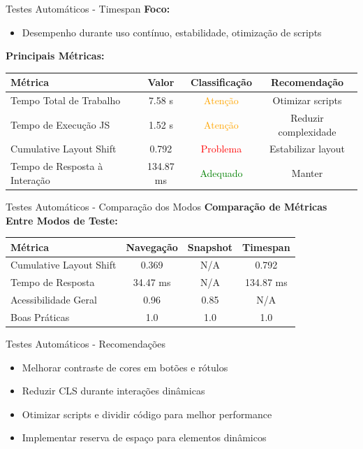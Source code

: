 \documentclass[landscape, 12pt]{beamer}
\begin{document}
\begin{frame}{Testes Automáticos - Timespan}
    \textbf{Foco:}
    \begin{itemize}
        \item Desempenho durante uso contínuo, estabilidade, otimização de scripts
    \end{itemize}
    \vspace{0.3cm}
    \textbf{Principais Métricas:}
    \begin{table}[h]
    \centering
    \tiny
    \begin{tabularx}{0.95\textwidth}{|X|c|c|c|}
    \hline
    \textbf{Métrica} & \textbf{Valor} & \textbf{Classificação} & \textbf{Recomendação} \\
    \hline
    Tempo Total de Trabalho & 7.58 s & \textcolor{orange}{Atenção} & Otimizar scripts \\
    \hline
    Tempo de Execução JS & 1.52 s & \textcolor{orange}{Atenção} & Reduzir complexidade \\
    \hline
    Cumulative Layout Shift & 0.792 & \textcolor{red}{Problema} & Estabilizar layout \\
    \hline
    Tempo de Resposta à Interação & 134.87 ms & \textcolor{green}{Adequado} & Manter \\
    \hline
    \end{tabularx}
    \end{table}
\end{frame}

\begin{frame}{Testes Automáticos - Comparação dos Modos}
    \textbf{Comparação de Métricas Entre Modos de Teste:}
    \begin{table}[h]
    \centering
    \scriptsize
    \begin{tabular}{|l|c|c|c|}
    \hline
    \textbf{Métrica} & \textbf{Navegação} & \textbf{Snapshot} & \textbf{Timespan} \\
    \hline
    Cumulative Layout Shift & 0.369 & N/A & 0.792 \\
    Tempo de Resposta & 34.47 ms & N/A & 134.87 ms \\
    Acessibilidade Geral & 0.96 & 0.85 & N/A \\
    Boas Práticas & 1.0 & 1.0 & 1.0 \\
    \hline
    \end{tabular}
    \end{table}
\end{frame}

\begin{frame}{Testes Automáticos - Recomendações}
    \begin{itemize}
        \item Melhorar contraste de cores em botões e rótulos
        \item Reduzir CLS durante interações dinâmicas
        \item Otimizar scripts e dividir código para melhor performance
        \item Implementar reserva de espaço para elementos dinâmicos
    \end{itemize}
\end{frame}
\end{document}
